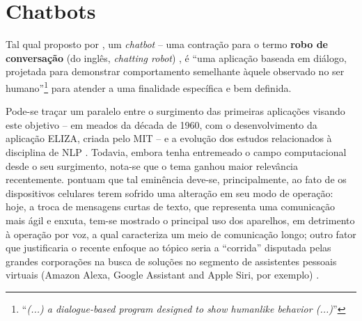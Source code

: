 \section{Chatbots}
\label{sec:chatbots}

Tal qual proposto por , um \textit{chatbot} -- uma contração para o termo \textbf{robo de conversação} (do inglês, \textit{chatting robot}) \cite{lokman2018modern}, é ``uma aplicação baseada em diálogo, projetada para demonstrar comportamento semelhante àquele observado no ser humano''\footnote{``\textit{(...) a dialogue-based program designed to show humanlike behavior (...)}''} \cite[tradução nossa]{wezel2020m} para atender a uma finalidade específica e bem definida.

Pode-se traçar um paralelo entre o surgimento das primeiras aplicações visando este objetivo -- em meados da década de 1960, com o desenvolvimento da aplicação ELIZA, criada pelo MIT -- e a evolução dos estudos relacionados à disciplina de NLP \cite{lokman2018modern,allen1988natural}. Todavia, embora tenha entremeado o campo computacional desde o seu surgimento, nota-se que o tema ganhou maior relevância recentemente.  pontuam que tal eminência deve-se, principalmente, ao fato de os dispositivos celulares terem sofrido uma alteração em seu modo de operação: hoje, a troca de mensagens curtas de texto, que representa uma comunicação mais ágil e enxuta, tem-se mostrado o principal uso dos aparelhos, em detrimento à operação por voz, a qual caracteriza um meio de comunicação longo; outro fator que justificaria o recente enfoque ao tópico seria a ``corrida''  disputada pelas grandes corporações na busca de soluções no segmento de assistentes pessoais virtuais (Amazon Alexa, Google Assistant and Apple Siri, por exemplo) \cite{lokman2018modern}.

